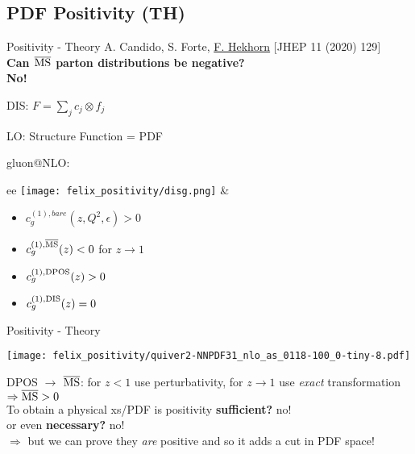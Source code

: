 \author[Felix Hekhorn]{}

\newcommand{\mmsbar}{{\overline{\rm {MS}}}}
\newcommand{\msbar}{$\mmsbar$}
\providecommand{\iRef}[1]{{\tiny\color{UniSec6} $[$#1$]$}}

\subsection{PDF Positivity (TH)}

\begin{frame}{Positivity - Theory}
A. Candido, S. Forte, \underline{F. Hekhorn} \iRef{JHEP 11 (2020) 129}\\
{\bf Can \msbar{} parton distributions be negative?}\\
{\large \hfill \bf No!}

DIS: $F = \sum_j c_j \otimes f_j$

LO: Structure Function = PDF \checkmark

gluon@NLO:\\
\begin{tabular}{ee}
\texttt{[image: felix\_positivity/disg.png]}
&
\begin{itemize}
\item $c_g^{(1), bare}(z,Q^2,\epsilon) > 0$ \checkmark
\item $c_g^{(1), \mmsbar}(z) < 0$ for $z \to 1$
\item $c_g^{(1), \rm{DPOS}}(z) > 0$ \checkmark
\item $c_g^{(1), \rm{DIS}}(z) = 0$ \checkmark
\end{itemize}
\end{tabular}

\end{frame}

\begin{frame}{Positivity - Theory}
\begin{center}
\texttt{[image: felix\_positivity/quiver2-NNPDF31\_nlo\_as\_0118-100\_0-tiny-8.pdf]}
\end{center}
\vspace{-2pt}
DPOS $\to$ \msbar: for $z < 1$ use perturbativity, for $z\to 1$ use \textit{exact} transformation $\Rightarrow \mmsbar > 0$\\
To obtain a physical xs/PDF is positivity {\bf sufficient?} no!\\
\hspace{149pt} or even {\bf necessary?} no!\\
$\Rightarrow$ but we can prove they \textit{are} positive and so it adds a cut in PDF space!
\end{frame}

